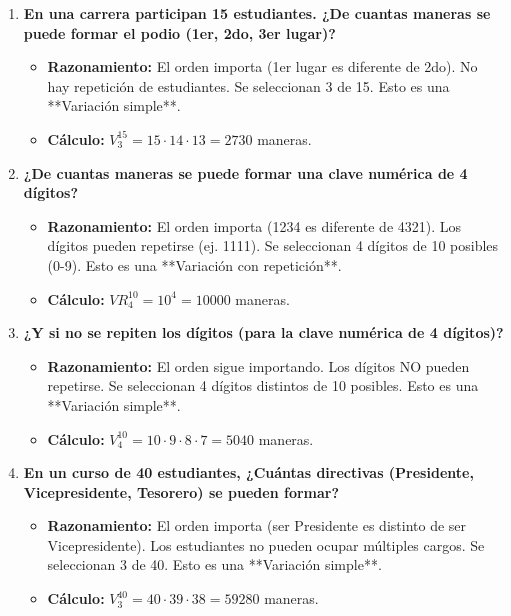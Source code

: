 \documentclass[12pt, letterpaper]{article}
\begin{document}
\begin{enumerate}[leftmargin=*,label=\arabic*.]
	\item \textbf{En una carrera participan 15 estudiantes. ¿De cuantas maneras se puede formar el podio (1er, 2do, 3er lugar)?}
	      \begin{itemize}
		      \item \textbf{Razonamiento:} El orden importa (1er lugar es diferente de 2do). No hay repetición de estudiantes. Se seleccionan 3 de 15. Esto es una **Variación simple**.
		      \item \textbf{Cálculo:} $V_3^{15} = 15 \cdot 14 \cdot 13 = 2730$ maneras.
	      \end{itemize}

	\item \textbf{¿De cuantas maneras se puede formar una clave numérica de 4 dígitos?}
	      \begin{itemize}
		      \item \textbf{Razonamiento:} El orden importa (1234 es diferente de 4321). Los dígitos pueden repetirse (ej. 1111). Se seleccionan 4 dígitos de 10 posibles (0-9). Esto es una **Variación con repetición**.
		      \item \textbf{Cálculo:} $VR_4^{10} = 10^4 = 10000$ maneras.
	      \end{itemize}

	\item \textbf{¿Y si no se repiten los dígitos (para la clave numérica de 4 dígitos)?}
	      \begin{itemize}
		      \item \textbf{Razonamiento:} El orden sigue importando. Los dígitos NO pueden repetirse. Se seleccionan 4 dígitos distintos de 10 posibles. Esto es una **Variación simple**.
		      \item \textbf{Cálculo:} $V_4^{10} = 10 \cdot 9 \cdot 8 \cdot 7 = 5040$ maneras.
	      \end{itemize}

	\item \textbf{En un curso de 40 estudiantes, ¿Cuántas directivas (Presidente, Vicepresidente, Tesorero) se pueden formar?}
	      \begin{itemize}
		      \item \textbf{Razonamiento:} El orden importa (ser Presidente es distinto de ser Vicepresidente). Los estudiantes no pueden ocupar múltiples cargos. Se seleccionan 3 de 40. Esto es una **Variación simple**.
		      \item \textbf{Cálculo:} $V_3^{40} = 40 \cdot 39 \cdot 38 = 59280$ maneras.
	      \end{itemize}


\end{enumerate}
\end{document}
